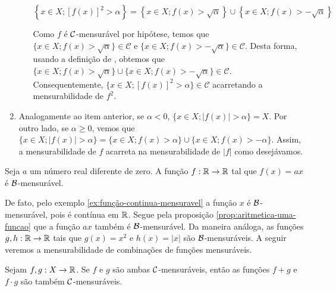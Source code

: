 \begin{prova}
\begin{enumerate}[label*=(\alph*)]
\begin{enumerate}[label = (\roman*)]
                $$\left\{x \in X; [f(x)]^2 > \alpha\right\} = \left\{x \in X; f(x)> \sqrt{\alpha}\right\}\cup \left\{x \in X; f(x)> -\sqrt{\alpha}\right\}$$
                
                Como $f$ é $\operatorname{\mathcal{C}}$-mensurável por hipótese, temos que $\{x \in X; f(x)> \sqrt{\alpha}\} \in \mathcal{C}$ e \linebreak $\{x \in X; f(x)> -\sqrt{\alpha}\} \in \mathcal{C}$.
                Desta forma, usando a definição de \sigal, obtemos que  $\{x \in X; f(x)> \sqrt{\alpha}\} \cup \{x \in X; f(x)> -\sqrt{\alpha}\} \in \mathcal{C}$. Consequentemente, 
                $\{x \in X; [f(x)]^2 > \alpha\} \in \mathcal{C}$ acarretando a mensurabilidade de $f^2$.
            \end{enumerate}
            
        \item Analogamente ao item anterior, se $\alpha < 0$, $\{x \in X; |f(x)| > \alpha\} = X$.
        Por outro lado, se $\alpha \geq 0$, vemos que 
        $\{x \in X; |f(x)| > \alpha\}=\{x \in X; f(x)> \alpha\} \cup \{x \in X; f(x)> -\alpha\}$.
        Assim, a mensurabilidade de $f$ acarreta na mensurabilidade de $|f|$ como desejávamos.
    \end{enumerate}
\end{prova}

\begin{example}
\label{ex:funcao-afim-mensuravel}
    Seja $a$ um número real diferente de zero. 
    A função $f: \mathbb{R} \to \mathbb{R}$ tal que $f(x) = ax$ é $\operatorname{\mathcal{B}}$-mensurável.
\end{example}
	
	De fato, pelo exemplo \ref{ex:função-continua-mensuravel} a função $x$ é $\operatorname{\mathcal{B}}$-mensurável, pois é contínua em $\mathbb{R}$.
	Segue pela proposição \ref{prop:aritmetica-uma-funcao} que a função $ax$ também é $\operatorname{\mathcal{B}}$-mensurável.
	Da maneira análoga, as funções $g,h: \mathbb{R} \to \mathbb{R}$ tais que $g(x) = x^2$ e $h(x) = |x|$ são $\operatorname{\mathcal{B}}$-mensuráveis. 
	A seguir veremos a mensurabilidade de combinações de funções mensuráveis.


\begin{proposition}
\label{prop:aritmetica-duas-funcoes}
    Sejam $f,g:X \to \mathbb{R}$. Se $f$ e $g$ são ambas $\operatorname{\mathcal{C}}$-mensuráveis, então as funções $f+g$ e $f\cdot g$ são também $\operatorname{\mathcal{C}}$-mensuráveis.
\end{proposition}

